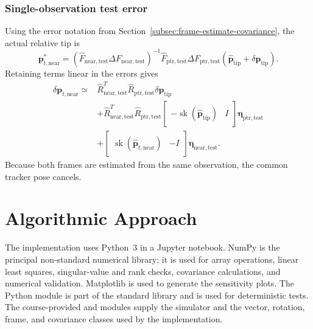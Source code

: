 \documentclass[11pt]{article}
\newcommand{\vct}[1]{\bm{#1}}
\newcommand{\sk}{\operatorname{sk}}
\begin{document}
\subsubsection{Single-observation test error}
Using the error notation from
Section~\ref{subsec:frame-estimate-covariance}, the actual relative tip is
\begin{equation}
\vct{p}_{t,\mathrm{near}}^*
=
(\widehat F_{\mathrm{near},\mathrm{test}}
\Delta F_{\mathrm{near},\mathrm{test}})^{-1}
\widehat F_{\mathrm{ptr},\mathrm{test}}
\Delta F_{\mathrm{ptr},\mathrm{test}}
(\widehat{\vct{p}}_{\mathrm{tip}}
+\delta\vct{p}_{\mathrm{tip}}).
\end{equation}
Retaining terms linear in the errors gives
\begin{equation}
\boxed{
\begin{aligned}
\delta\vct{p}_{t,\mathrm{near}}
\simeq{}&
\widehat R_{\mathrm{near},\mathrm{test}}^T
\widehat R_{\mathrm{ptr},\mathrm{test}}
\delta\vct{p}_{\mathrm{tip}}\\
&+\widehat R_{\mathrm{near},\mathrm{test}}^T
\widehat R_{\mathrm{ptr},\mathrm{test}}
\begin{bmatrix}
-\sk(\widehat{\vct{p}}_{\mathrm{tip}})&I
\end{bmatrix}
\vct{\eta}_{\mathrm{ptr},\mathrm{test}}\\
&+\begin{bmatrix}
\sk(\widehat{\vct{p}}_{t,\mathrm{near}})&-I
\end{bmatrix}
\vct{\eta}_{\mathrm{near},\mathrm{test}}.
\end{aligned}}
\end{equation}
Because both frames are estimated from the same observation, the common
tracker pose cancels.

\section{Algorithmic Approach}
The implementation uses Python~3 in a Jupyter notebook.  NumPy is the
principal non-standard numerical library; it is used for array operations,
linear least squares, singular-value and rank checks, covariance calculations,
and numerical validation.  Matplotlib is used to generate the sensitivity
plots.  The Python  module is part of the standard library and
is used for deterministic tests.  The course-provided  and
 modules supply the simulator and the vector, rotation, frame,
and covariance classes used by the implementation.
\end{document}
